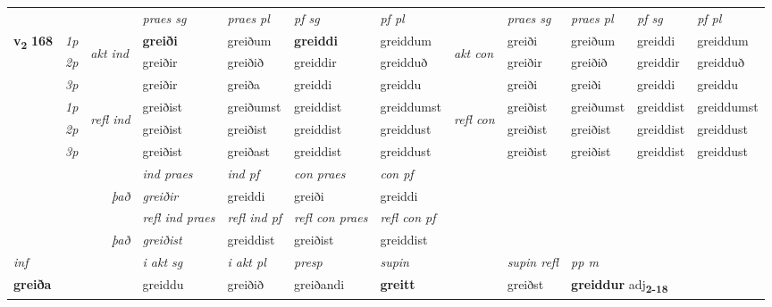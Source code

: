 \begin{longtable}[l]{X>{\footnotesize\itshape}llXXXXlXXXX}
\midrule

 & &   & \textit{praes sg}  & \textit{praes pl}    & \textit{ pf sg} & \textit{pf pl} & & \textit{praes sg}  & \textit{praes pl}    & \textit{pf sg} & \textit{pf pl }  \\ \cmidrule{4-7} \cmidrule{9-12}
 \multirow{2}{*}{{{\textbf{v{\textsubscript{2}}} \Large{\textbf{168}}}}}  & 1p & \multirow{3}{*}{\begin{turn}{90}\textit{akt ind}\end{turn}} & \textbf{greiði} & greiðum & \textbf{greiddi} & greiddum & \multirow{3}{*}{\begin{turn}{90}\textit{akt con}\end{turn}} &greiði & greiðum & greiddi & greiddum\\*
 & 2p &  &  greiðir  & greiðið & greiddir & greidduð & & greiðir & greiðið & greiddir & greidduð \\*
 & 3p &  & greiðir & greiða & greiddi & greiddu & & greiði & greiði& greiddi & greiddu \\*
\cmidrule{4-7} \cmidrule{9-12}
 & 1p & \multirow{3}{*}{\begin{turn}{90}\textit{refl ind}\end{turn}}  & greiðist & greiðumst & greiddist & greiddumst & \multirow{3}{*}{\begin{turn}{90}\textit{refl con}\end{turn}}  &greiðist & greiðumst & greiddist & greiddumst \\*
 & 2p &  & greiðist & greiðist & greiddist & greiddust & &greiðist & greiðist & greiddist & greiddust \\*
 & 3p  & & greiðist & greiðast & greiddist & greiddust & & greiðist & greiðist& greiddist & greiddust \\*
\cmidrule{4-7} \cmidrule{9-12}

   && &  \textit{ind praes} & \textit{ind pf} & \textit{con praes} & \textit{con pf} \\*
\multicolumn{3}{r}{\textit{það}} & greiðir & greiddi & greiði & greiddi \\*

\cmidrule{4-7}
 & && \textit{refl ind praes} & \textit{refl ind pf} & \textit{refl con praes} & \textit{refl con pf} \\*
\multicolumn{3}{r}{\textit{það}}& greiðist & greiddist & greiðist & greiddist \\*

\cmidrule{4-7}
   {\textit{inf}} & &  & \textit{i akt sg} & \textit{i akt pl}   & \textit{presp} & \textit{supin} && \textit{supin refl} & \textit{pp m} \\*
  {\textbf{greiða}} & && greiddu  & greiðið   & greiðandi &  \textbf{greitt} && greiðst & \multicolumn{2}{l}{\textbf{greiddur} adj\textbf{\textsubscript{2-18}}} \\*


\end{longtable}
